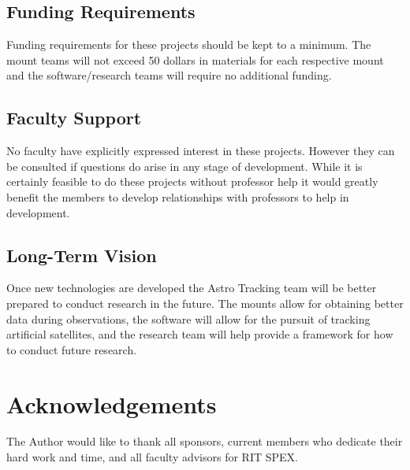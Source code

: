 \documentclass[conference]{IEEEtran} %
\begin{document}
\subsection{Funding Requirements}
Funding requirements for these projects should be kept to a minimum.
The mount teams will not exceed 50 dollars in materials for each respective mount and the software/research teams will require no additional funding.


\subsection{Faculty Support}
No faculty have explicitly expressed interest in these projects. However they can be consulted if questions do arise in any stage of development.  While it is certainly feasible to do these projects without professor help it would greatly benefit the members to develop relationships with professors to help in development.

\subsection{Long-Term Vision}
\label{sec:vision}
Once new technologies are developed the Astro Tracking team will be better prepared to conduct research in the future.  The mounts allow for obtaining better data during observations, the software will allow for the pursuit of tracking artificial satellites, and the research team will help provide a framework for how to conduct future research.

\section*{Acknowledgements}
The Author would like to thank all sponsors, current members who dedicate their hard work and time, and all faculty advisors for RIT SPEX.





\end{document}
